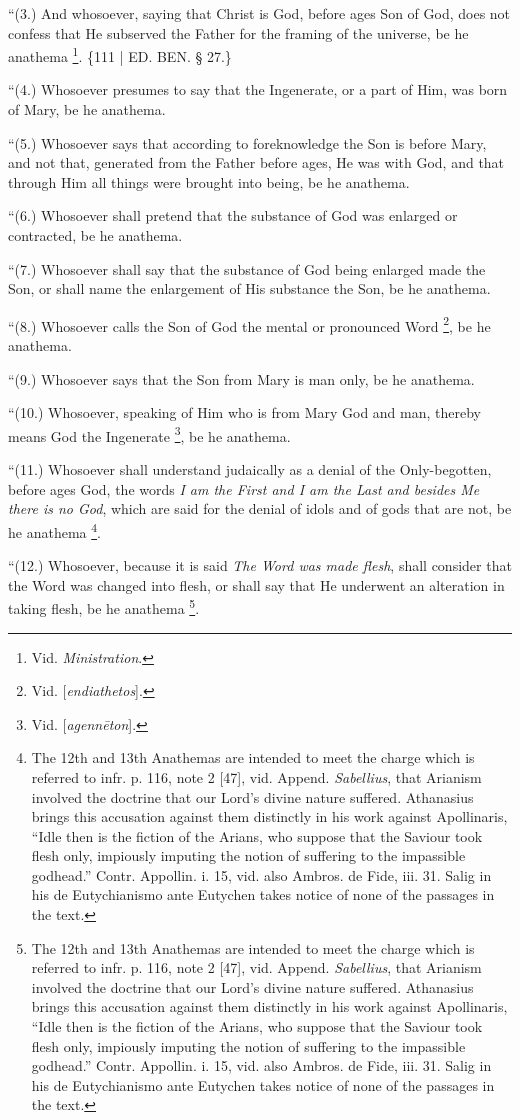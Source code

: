 ``(3.) And whosoever, saying
that Christ is God, before ages Son of God, does not confess that He
subserved the Father for the framing of the universe, be he anathema \footnote{Vid. \emph{Ministration}.}. \{111 | ED.
BEN. § 27.\}

``(4.) Whosoever presumes to
say that the Ingenerate, or a part of Him, was born of Mary, be he
anathema.

``(5.) Whosoever says that
according to foreknowledge the Son is before Mary, and not that,
generated from the Father before ages, He was with God, and that
through Him all things were brought into being, be he anathema.

``(6.) Whosoever shall pretend
that the substance of God was enlarged or contracted, be he anathema.

``(7.) Whosoever shall say that
the substance of God being enlarged made the Son, or shall name the
enlargement of His substance the Son, be he anathema.

``(8.) Whosoever calls the Son
of God the mental or pronounced Word \footnote{Vid. [\emph{endiathetos}].}, be he anathema.

``(9.) Whosoever says that the
Son from Mary is man only, be he anathema.

``(10.) Whosoever, speaking of
Him who is from Mary God and man, thereby means God the Ingenerate \footnote{Vid. [\emph{agenn\={e}ton}].}, be he anathema.

``(11.) Whosoever shall
understand judaically as a denial of the Only-begotten, before ages
God, the words \emph{I am the First and I am the Last and besides Me
there is no God}, which are said for the denial of idols and of
gods that are not, be he anathema \footnote{\emph{}The 12th and 13th Anathemas are intended to meet the charge which
is referred to infr. p. 116, note 2 [47], vid. Append. \emph{Sabellius},
that Arianism involved the doctrine that our Lord's divine nature
suffered. Athanasius brings this accusation against them distinctly in
his work against Apollinaris, ``Idle then is the fiction of the Arians,
who suppose that the Saviour took flesh only, impiously imputing the
notion of suffering to the impassible godhead.'' Contr. Appollin. i.
15, vid. also Ambros. de Fide, iii. 31. Salig in his de Eutychianismo
ante Eutychen takes notice of none of the passages in the text.}.

``(12.) Whosoever, because it
is said \emph{The Word was made flesh}, shall consider that the Word
was changed into flesh, or shall say that He underwent an alteration
in taking flesh, be he anathema \footnote{\emph{}The 12th and 13th Anathemas are intended to meet the charge which
is referred to infr. p. 116, note 2 [47], vid. Append. \emph{Sabellius},
that Arianism involved the doctrine that our Lord's divine nature
suffered. Athanasius brings this accusation against them distinctly in
his work against Apollinaris, ``Idle then is the fiction of the Arians,
who suppose that the Saviour took flesh only, impiously imputing the
notion of suffering to the impassible godhead.'' Contr. Appollin. i.
15, vid. also Ambros. de Fide, iii. 31. Salig in his de Eutychianismo
ante Eutychen takes notice of none of the passages in the text.}.

